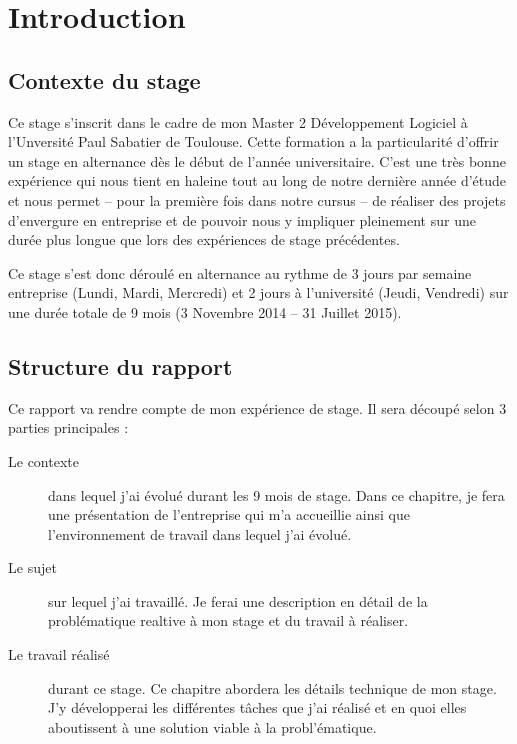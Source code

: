 \chapter{Introduction}

\section*{Contexte du stage}
Ce stage s'inscrit dans le cadre de mon Master 2 Développement Logiciel à l'Unversité Paul Sabatier de Toulouse. Cette formation a la particularité d'offrir un stage en alternance dès le début de l'année universitaire. C'est une très bonne expérience qui nous tient en haleine tout au long de notre dernière année d'étude et nous permet -- pour la première fois dans notre cursus -- de réaliser des projets d'envergure en entreprise et de pouvoir nous y impliquer pleinement sur une durée plus longue que lors des expériences de stage précédentes.

Ce stage s'est donc déroulé en alternance au rythme de 3 jours par semaine entreprise (Lundi, Mardi, Mercredi) et 2 jours à l'université (Jeudi, Vendredi) sur une durée totale de 9 mois (3 Novembre 2014 -- 31 Juillet 2015).

\section*{Structure du rapport}
Ce rapport va rendre compte de mon expérience de stage. Il sera découpé selon 3 parties principales :
\begin{description}
	\item[Le contexte] dans lequel j'ai évolué durant les 9 mois de stage. Dans ce chapitre, je fera une présentation de l'entreprise qui m'a accueillie ainsi que l'environnement de travail dans lequel j'ai évolué.
	\item[Le sujet] sur lequel j'ai travaillé. Je ferai une description en détail de la problématique realtive à mon stage et du travail à réaliser.
	\item[Le travail réalisé] durant ce stage. Ce chapitre abordera les détails technique de mon stage. J'y développerai les différentes tâches que j'ai réalisé et en quoi elles aboutissent à une solution viable à la probl'ématique.
\end{description}

